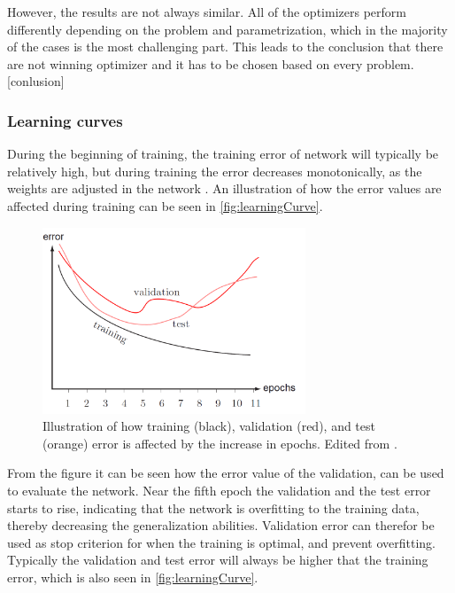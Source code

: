 However, the results are not always similar. All of the optimizers perform differently depending on the problem and parametrization, which in the majority of the cases is the most challenging part. This leads to the conclusion that there are not winning optimizer and it has to be chosen based on every problem. [conlusion]





\subsubsection{Learning curves}
During the beginning of training, the training error of network will typically be relatively high, but during training the error decreases monotonically, as the weights are adjusted in the network \citep{Duda2000}. An illustration of how the error values are affected during training can be seen in \autoref{fig:learningCurve}.

\begin{figure} [H]
\centering
\includegraphics[width=0.7\textwidth]{figures/learningCurves}
\caption{Illustration of how training (black), validation (red), and test (orange) error is affected by the increase in epochs. Edited from \citep{Duda2000}.}
\label{fig:learningCurve}
\end{figure}

From the figure it can be seen how the error value of the validation, can be used to evaluate the network. 
Near the fifth epoch the validation and the test error starts to rise, indicating that the network is overfitting to the training data, thereby decreasing the generalization abilities. 
Validation error can therefor be used as stop criterion for when the training is optimal, and prevent overfitting. 
Typically the validation and test error will always be higher that the training error, which is also seen in \autoref{fig:learningCurve}. \citep{Duda2000}


